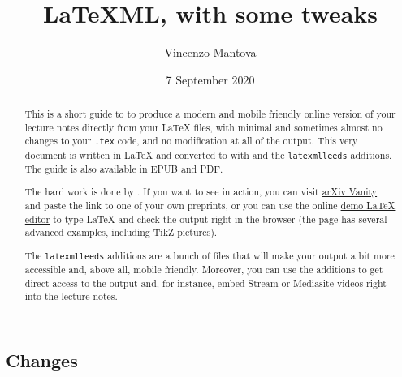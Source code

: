\documentclass[a4paper]{article}
\title{LaTeXML, with some tweaks}
\author{Vincenzo Mantova}
\date{7 September 2020}
\theoremstyle{definition}
\begin{document}
\maketitle

\begin{abstract}
  This is a short guide to \LaTeXML{} to produce a modern and mobile friendly online version of your lecture notes directly from your \LaTeX{} files, with minimal and sometimes almost no changes to your \verb|.tex| code, and no modification at all of the \HTML{} output. This very document is written in \LaTeX{} and converted to \HTML{} with \LaTeXML{} and the \verb|latexmlleeds| additions. The guide is also available in \href{LaTeXML-Leeds.epub}{EPUB} and \href{LaTeXML-Leeds.pdf}{PDF}.

  The hard work is done by \LaTeXML{}. If you want to see \LaTeXML{} in action, you can visit \href{https://www.arxiv-vanity.com/}{arXiv Vanity} and paste the link to one of your own preprints, or you can use the online \href{https://latexml.mathweb.org/editor}{demo \LaTeX{} editor} to type \LaTeX{} and check the \HTML{} output right in the browser (the page has several advanced examples, including TikZ pictures).

  The \verb|latexmlleeds| additions are a bunch of files that will make your output a bit more accessible and, above all, mobile friendly. Moreover, you can use the additions to get direct access to the \HTML{} output and, for instance, embed Stream or Mediasite videos right into the lecture notes.
\end{abstract}

\subsection*{Changes}
\end{document}
